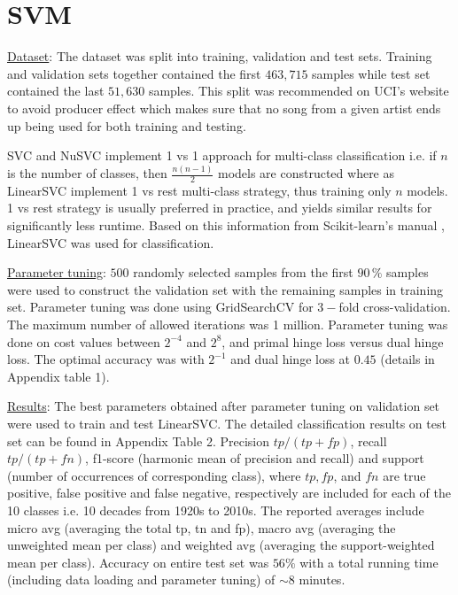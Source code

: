 \documentclass{article}
\begin{document}
\section*{SVM}
\underline{Dataset}: The dataset was split into training, validation and test sets. Training and validation sets together contained the first $463,715$ samples while test set contained the last $51,630$ samples. This split was recommended on UCI's website to avoid producer effect which makes sure that no song from a given artist ends up being used for both training and testing. 

\noindent SVC and NuSVC implement 1 vs 1 approach for multi-class classification i.e. if $n$ is the number of classes, then $\frac{n(n-1)}{2}$ models are constructed where as LinearSVC implement 1 vs rest multi-class strategy, thus training only $n$ models. 1 vs rest strategy is usually preferred in practice, and yields similar results for significantly less runtime. Based on this information from Scikit-learn's manual \cite{buitinck2013}, LinearSVC was used for classification. 

\noindent  \underline{Parameter tuning}: $500$ randomly selected samples from the first $90 \, \%$ samples were used to construct the validation set with the remaining samples in training set. Parameter tuning was done using GridSearchCV for $3-$fold cross-validation. The maximum number of allowed iterations was 1 million. Parameter tuning was done on cost values between $2^{-4}$ and $2^8$, and primal hinge loss versus dual hinge loss. The optimal accuracy was with $2^{-1}$ and dual hinge loss at $0.45$ (details in Appendix table 1). 

\noindent  \underline{Results}: The best parameters obtained after parameter tuning on validation set were used to train and test LinearSVC. The detailed classification results on test set can be found in Appendix Table 2. Precision $tp/(tp+fp)$, recall $tp/(tp+fn)$, f1-score (harmonic mean of precision and recall) and support (number of occurrences of corresponding class), where $tp, fp$, and $fn$ are true positive, false positive and false negative, respectively are included for each of the 10 classes i.e. 10 decades from 1920s to 2010s. The reported averages include micro avg (averaging the total tp, tn and fp), macro avg (averaging the unweighted mean per class) and weighted avg (averaging the support-weighted mean per class). Accuracy on entire test set was $56 \%$ with a total running time (including data loading and parameter tuning) of $\sim 8$ minutes. 
\end{document}
